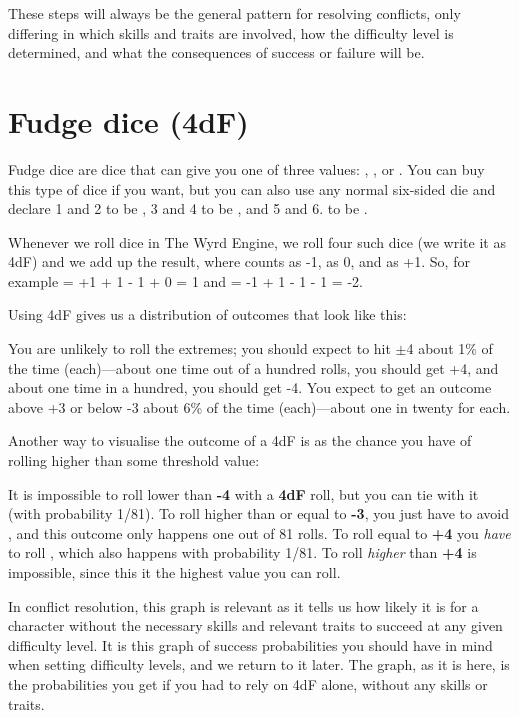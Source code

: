 These steps will always be the general pattern for resolving conflicts, only differing in which skills and traits are involved, how the difficulty level is determined, and what the consequences of success or failure will be.

\section{Fudge dice (4dF)}\label{core:fudge-dice}

Fudge dice are dice that can give you one of three values: \FudgeDie{-}, \FudgeDie{}, or \FudgeDie{+}. You can buy this type of dice if you want, but you can also use any normal six-sided die and declare 1 and 2 to be \FudgeDie{-}, 3 and 4 to be \FudgeDie{}, and 5 and 6. to be \FudgeDie{+}.

Whenever we roll dice in The Wyrd Engine, we roll four such dice (we write it as 4dF) and we add up the result, where \FudgeDie{-} counts as -1, \FudgeDie{} as 0, and \FudgeDie{+} as +1. So, for example
	 = +1 + 1 - 1 + 0 = 1
	and 
	\FudgeRes{-+--} = -1 + 1 - 1 - 1 = -2.

Using 4dF gives us a distribution of outcomes that look like this:

You are unlikely to roll the extremes; you should expect to hit $\pm$4 about 1\% of the time (each)---about one time out of a hundred rolls, you should get +4, and about one time in a hundred, you should get -4. You expect to get an outcome above +3 or below -3 about 6\% of the time (each)---about one in twenty for each.

Another way to visualise the outcome of a 4dF is as the chance you have of rolling higher than some threshold value:


It is impossible to roll lower than \textbf{-4} with a \textbf{4dF} roll, but you can tie with it (with probability 1/81).
To roll higher than or equal to \textbf{-3}, you just have to avoid \FudgeRes{----}, and this outcome only happens one out of 81 rolls. To roll equal to \textbf{+4} you \emph{have} to roll \FudgeRes{++++}, which also happens with probability 1/81. To roll \emph{higher} than \textbf{+4} is impossible, since this it the highest value you can roll.

In conflict resolution, this graph is relevant as it tells us how likely it is for a character without the necessary skills and relevant traits to succeed at any given difficulty level. It is this graph of success probabilities you should have in mind when setting difficulty levels, and we return to it later. The graph, as it is here, is the probabilities you get if you had to rely on 4dF alone, without any skills or traits.


